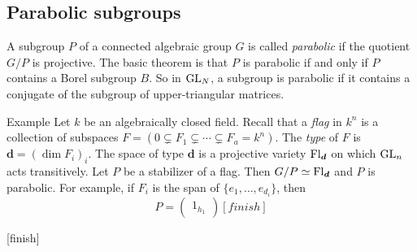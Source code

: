 \subsection{Parabolic subgroups}

A subgroup $P$ of a connected algebraic group $G$ is called \emph{parabolic} if 
the quotient $G/P$ is projective. The basic theorem is that $P$ is parabolic if 
and only if $P$ contains a Borel subgroup $B$. So in $\operatorname{GL}_N$, a 
subgroup is parabolic if it contains a conjugate of the subgroup of 
upper-triangular matrices. 

\begin{enonce}[remark]{Example}
Let $k$ be an algebraically closed field. Recall that a \emph{flag} in 
$k^n$ is a collection of subspaces 
$F=(0\subsetneq F_1\subsetneq \cdots \subsetneq F_a=k^n)$. The \emph{type} of 
$F$ is $\boldsymbol d=(\dim F_i)_i$. The space of type $\boldsymbol d$ is a 
projective variety $\operatorname{Fl}_{\boldsymbol d}$ on which $\operatorname{GL}_n$ acts 
transitively. Let $P$ be a stabilizer of a flag. Then 
$G/P\simeq \operatorname{Fl}_{\boldsymbol d}$ and $P$ is parabolic. For example, if 
$F_i$ is the span of $\{e_1,\dots,e_{d_i}\}$, then 
\[
  P = \begin{pmatrix} 1_{h_1} \end{pmatrix} [finish]
\]
\end{enonce}

[finish]




